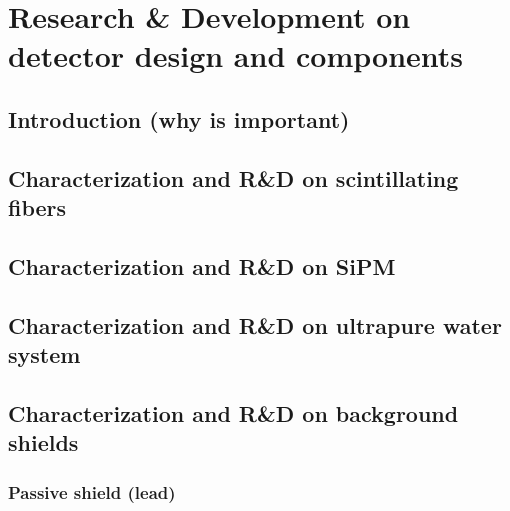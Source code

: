 \documentclass[12pt,a4paper]{book}
\begin{document}
\chapter[Research \& Development]{Research \& Development on detector design and components}\label{chap:ResearchandDevelopment}
	\section{Introduction (why is important)}
	 \label{sec:IntroCharacterisation}
	\newpage
	
	\section[Characetrization fibers]{Characterization and R\&D on scintillating fibers}
	\label{sec:CharacterizationScintillatingFibers}
	\newpage
		
	\section[Characterization SiPM]{Characterization and R\&D on SiPM}
	\label{sec:CharacterizationSiPM}
	\newpage
	
	\section[Characetrization water system]{Characterization and R\&D on ultrapure water system}
	\label{sec:CharacterizationUltraPureWaterSystem}
	\newpage
		
	\section[Characterization shields]{Characterization and R\&D on background shields}
	\label{sec:RyDBackground}
	
	\subsection{Passive shield (lead)}
	 \label{subsec:CharacterizationPassiveShield}
					 
\end{document}
